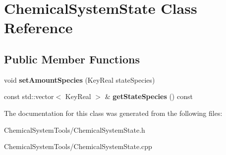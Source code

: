 \hypertarget{classChemicalSystemState}{
\section{ChemicalSystemState Class Reference}
\label{classChemicalSystemState}
}
\subsection*{Public Member Functions}
\begin{DoxyCompactItemize}
\item 
\hypertarget{classChemicalSystemState_a90288975cb9a28e55d50851e8a4fd962}{
void {\bfseries setAmountSpecies} (KeyReal stateSpecies)}
\label{classChemicalSystemState_a90288975cb9a28e55d50851e8a4fd962}

\item 
\hypertarget{classChemicalSystemState_a0778859d03b8dde1e9654e17a35b6159}{
const std::vector$<$ KeyReal $>$ \& {\bfseries getStateSpecies} () const }
\label{classChemicalSystemState_a0778859d03b8dde1e9654e17a35b6159}

\end{DoxyCompactItemize}


The documentation for this class was generated from the following files:\begin{DoxyCompactItemize}
\item 
ChemicalSystemTools/ChemicalSystemState.h\item 
ChemicalSystemTools/ChemicalSystemState.cpp\end{DoxyCompactItemize}
